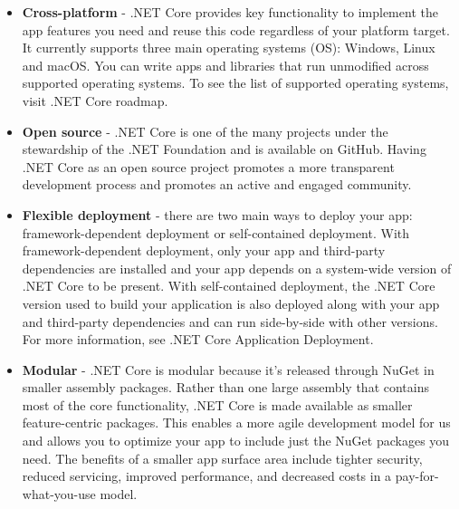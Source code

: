 \documentclass[../thesis.tex]{subfiles}
\begin{document}
\begin{itemize}
  \item \textbf{Cross-platform} - .NET Core provides key functionality to implement the app features you need and reuse this code regardless of your platform target. It currently supports three main operating systems (OS): Windows, Linux and macOS. You can write apps and libraries that run unmodified across supported operating systems. To see the list of supported operating systems, visit .NET Core roadmap.
  \newline
    
  \item \textbf{Open source} - .NET Core is one of the many projects under the stewardship of the .NET Foundation and is available on GitHub. Having .NET Core as an open source project promotes a more transparent development process and promotes an active and engaged community.
  \newline
    
  \item \textbf{Flexible deployment} - there are two main ways to deploy your app: framework-dependent deployment or self-contained deployment. With framework-dependent deployment, only your app and third-party dependencies are installed and your app depends on a system-wide version of .NET Core to be present. With self-contained deployment, the .NET Core version used to build your application is also deployed along with your app and third-party dependencies and can run side-by-side with other versions. For more information, see .NET Core Application Deployment.
  \newline
    
  \item \textbf{Modular} - .NET Core is modular because it's released through NuGet in smaller assembly packages. Rather than one large assembly that contains most of the core functionality, .NET Core is made available as smaller feature-centric packages. This enables a more agile development model for us and allows you to optimize your app to include just the NuGet packages you need. The benefits of a smaller app surface area include tighter security, reduced servicing, improved performance, and decreased costs in a pay-for-what-you-use model.
\end{itemize}
    
\end{document}
